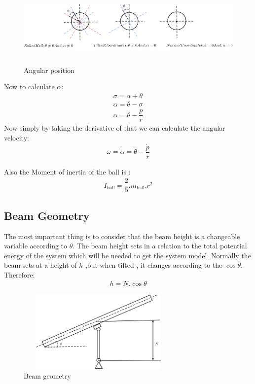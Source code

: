 \documentclass{article}
\begin{document}
\begin{figure}[h]
	\centering
	\includegraphics[height = 4cm,width =12cm]{Angles_System_Geo}
	\caption{Angular position}\label{Angles_System_Geo}
\end{figure}
Now to calculate $\alpha$:
\begin{equation}
	\begin{split}
		\sigma = \alpha + \theta \\
		\alpha = \theta - \sigma \\
		\alpha = \theta - \dfrac{p}{r}		
	\end{split}
\end{equation}
Now simply by taking the derivative of that we can calculate the angular velocity:
\begin{equation}
	\begin{split}
		\omega = \dot{\alpha} = \dot{\theta} - \dfrac{\dot{p}}{r}
	\end{split}
\end{equation}

Also the Moment of inertia of the ball is : 
\begin{equation}
	\begin{split}
		I_{\text{ball}} = \dfrac{2}{5}.m_{\text{ball}}.r^2
	\end{split}
\end{equation}
\newpage
\subsection{Beam Geometry}
The most important thing is to consider that the beam height is a changeable variable according to $\theta$.
The beam height sets in a relation to the total potential energy of the system which will be needed to get the system model.
Normally the beam  sets at a height of $h$ ,but when tilted , it changes according to the $\cos{\theta}$.
Therefore:
\begin{equation}
	\begin{split}
		h = N.\cos{\theta}
	\end{split}
\end{equation}
\begin{figure}[h]
	\centering
	\includegraphics[height = 4cm,width =8cm]{Beam_System_Geo}
	\caption{Beam geometry}\label{Beam_System_Geo}
\end{figure}
\end{document}
